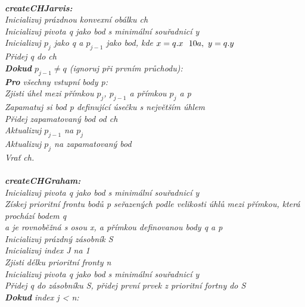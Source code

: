 \documentclass{article}
\begin{document}
\vspace{5,5cm}\\
\indent\textit{\textbf{createCHJarvis:}}\\
\indent\textit{Inicializuj prázdnou konvexní obálku ch}\\
\indent\textit{Inicializuj pivota q jako bod s minimální souřadnicí y}\\
\indent\textit{Inicializuj $p_{j}$ jako q a $p_{j-1}$ jako bod, kde $x = q.x~\-~10a,~y = q.y$}\\
\indent\textit{Přidej q do ch}\\
\indent\textit{\textbf{Dokud} $p_{j-1} \ne q$ (ignoruj při prvním průchodu):}\\
\indent\indent\textit{\textbf{Pro} všechny vstupní body p:}\\
\indent\indent\indent\textit{Zjisti úhel mezi přímkou $p_{j}$, $p_{j-1}$ a přímkou $p_{j}$ a p}\\
\indent\indent\indent\textit{Zapamatuj si bod p definující úsečku s největším úhlem}\\
\indent\indent\textit{Přidej zapamatovaný bod od ch}\\
\indent\indent\textit{Aktualizuj $p_{j-1}$ na $p_{j}$}\\
\indent\indent\textit{Aktualizuj $p_{j}$ na zapamatovaný bod}\\
\indent\textit{Vrať ch.}\\
\vspace{0.2cm}\\
\indent\textit{\textbf{createCHGraham:}}\\
\indent\textit{Inicializuj pivota q jako bod s minimální souřadnicí y}\\
\indent\textit{Získej prioritní frontu bodů p seřazených podle velikosti úhlů mezi přímkou, která prochází bodem q}\\
\indent\textit{a je rovnoběžná s osou x, a přímkou definovanou body q a p}\\
\indent\textit{Inicializuj prázdný zásobník S}\\
\indent\textit{Inicializuj index J na 1}\\
\indent\textit{Zjisti délku prioritní fronty n}\\
\indent\textit{Inicializuj pivota q jako bod s minimální souřadnicí y}\\
\indent\textit{Přidej q do zásobníku S, přidej první prvek z prioritní fortny do S}\\
\indent\textit{\textbf{Dokud} index j < n:}\\
\end{document}
